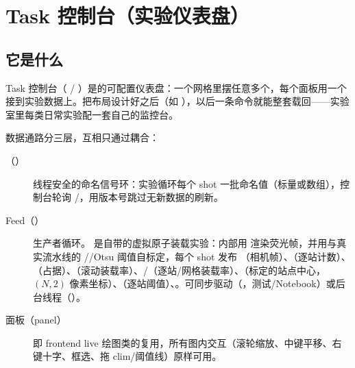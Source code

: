 \documentclass[11pt,oneside,openany]{book}
\begin{document}
\chapter{Task 控制台（实验仪表盘）}

\section{它是什么}
Task 控制台（ / ）是的可配置仪表盘：一个网格里摆任意多个，每个面板用一个接到实验数据上。把布局设计好之后（如 ），以后一条命令就能整套载回——实验室里每类日常实验配一套自己的监控台。

数据通路分三层，互相只通过耦合：
\begin{description}
  \item[（）] 线程安全的命名信号环：实验循环每个 shot  一批命名值（标量或数组），控制台轮询 /，用版本号跳过无新数据的刷新。
  \item[Feed（）] 生产者循环。 是自带的虚拟原子装载实验：内部用  渲染荧光帧，并用与真实流水线的 //Otsu 阈值自标定，每个 shot 发布 （相机帧）、（逐站计数）、（占据）、（滚动装载率）、/（逐站/网格装载率）、（标定的站点中心，$(N,2)$ 像素坐标）、（逐站阈值）、。可同步驱动（，测试/Notebook）或后台线程（）。
  \item[面板（panel）] 即 frontend live 绘图类的复用，所有图内交互（滚轮缩放、中键平移、右键十字、框选、拖 clim/阈值线）原样可用。
\end{description}
\end{document}
